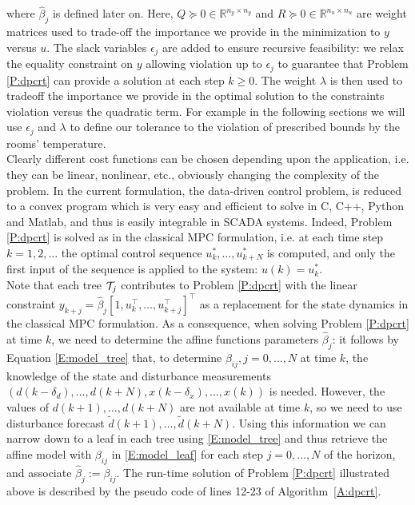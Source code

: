 \noindent \textcolor[rgb]{0,0,1}{where $\hat \beta_j$ is defined later on. Here, $Q \succeq 0 \in \mathbb{R}^{n_y\times n_y}$ and $R \succeq 0 \in \mathbb{R}^{n_u\times n_u}$ are weight matrices used to trade-off the importance we provide in the minimization to $y$ versus $u$. The slack variables $\epsilon_j$ are added to ensure recursive feasibility: we relax the equality constraint on $y$ allowing violation up to $\epsilon_j$ to guarantee that Problem \ref{P:dpcrt} can provide a solution at each step $k \geq 0$. The weight $\lambda$ is then used to tradeoff the importance we provide in the optimal solution to the constraints violation versus the quadratic term. For example in the following sections we will use $\epsilon_j$ and $\lambda$ to define our tolerance to the violation of prescribed bounds by the rooms' temperature.\\
Clearly different cost functions can be chosen depending upon the application, i.e. they can be linear, nonlinear, etc., obviously changing the complexity of the problem. In the current formulation, the data-driven control problem, is reduced to a convex program which is very easy and efficient to solve in C, C++, Python and Matlab, and thus is easily integrable in SCADA systems.
Indeed, Problem \ref{P:dpcrt} is solved as in the classical MPC formulation, i.e. at each time step $k=1,2,\ldots$ the optimal control sequence $u^*_k,\ldots,u^*_{k+N}$ is computed, and only the first input of the sequence is applied to the system: $u(k) = u^*_k$.\\
Note that each tree $\mathcal{T}_j$ contributes to Problem  \ref{P:dpcrt} with the linear constraint $y_{k+j} = \hat \beta_{j} [1,u^\top_{k},\ldots,u^\top_{k+j} ]^\top$ as a replacement for the state dynamics in the classical MPC formulation. As a consequence, when solving Problem \ref{P:dpcrt} at time $k$, we need to determine the affine functions parameters $\hat \beta_{j}$: it follows by Equation \eqref{E:model_tree} that, to determine $\beta_{ij}, j=0,\ldots,N$ at time $k$, the knowledge of the state and disturbance measurements $\left( d(k-\delta_d),\ldots,d(k+N),x(k-\delta_x),\ldots,x(k) \right)$ is needed. However, the values of $d(k+1),\ldots,d(k+N)$ are not available at time $k$, so we need to use disturbance forecast $\tilde d(k+1),\ldots,\tilde d(k+N)$. Using this information we can narrow down to a leaf in each tree using \eqref{E:model_tree} and thus retrieve the affine model with $\beta_{ij}$ in \eqref{E:model_leaf} for each step $j=0,\ldots,N$ of the horizon, and associate $\hat \beta_j := \beta_{ij}$. The run-time solution of Problem \ref{P:dpcrt} illustrated above is described by the pseudo code of lines 12-23 of Algorithm~\ref{A:dpcrt}.}

